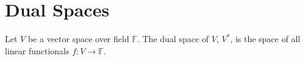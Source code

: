 \chapter{Dual Spaces}
Let $V$ be a vector space over field $\mathbb{F}$. The dual space of $V$, $V^*$, is the space of all linear functionals $f: V\rightarrow \mathbb{F}$.